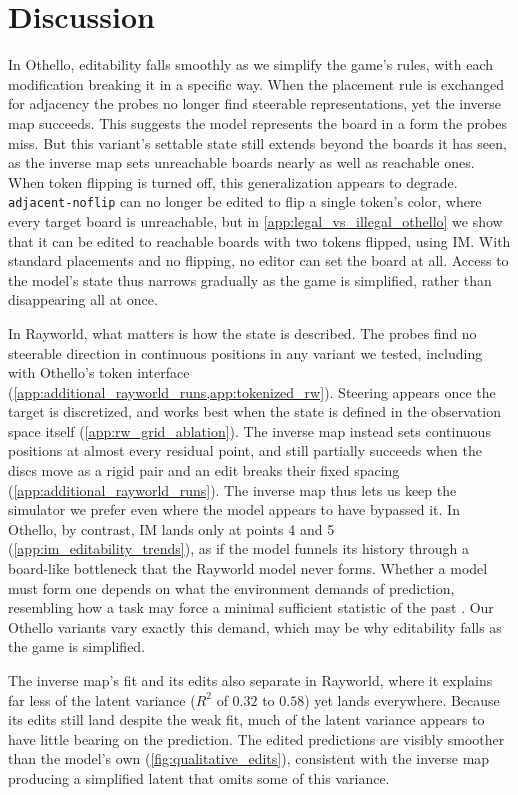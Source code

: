 \documentclass{article} %
\begin{document}
\section{Discussion}
In Othello, editability falls smoothly as we simplify the game's rules, with each modification breaking it in a specific way. When the placement rule is exchanged for adjacency the probes no longer find steerable representations, yet the inverse map succeeds. This suggests the model represents the board in a form the probes miss. But this variant's settable state still extends beyond the boards it has seen, as the inverse map sets unreachable boards nearly as well as reachable ones. When token flipping is turned off, this generalization appears to degrade. \texttt{adjacent-noflip} can no longer be edited to flip a single token's color, where every target board is unreachable, but in \cref{app:legal_vs_illegal_othello} we show that it can be edited to reachable boards with two tokens flipped, using IM. With standard placements and no flipping, no editor can set the board at all. Access to the model's state thus narrows gradually as the game is simplified, rather than disappearing all at once.

In Rayworld, what matters is how the state is described. The probes find no steerable direction in continuous positions in any variant we tested, including with Othello's token interface (\cref{app:additional_rayworld_runs,app:tokenized_rw}). Steering appears once the target is discretized, and works best when the state is defined in the observation space itself (\cref{app:rw_grid_ablation}). The inverse map instead sets continuous positions at almost every residual point, and still partially succeeds when the discs move as a rigid pair and an edit breaks their fixed spacing (\cref{app:additional_rayworld_runs}). The inverse map thus lets us keep the simulator we prefer even where the model appears to have bypassed it. In Othello, by contrast, IM lands only at points 4 and 5 (\cref{app:im_editability_trends}), as if the model funnels its history through a board-like bottleneck that the Rayworld model never forms. Whether a model must form one depends on what the environment demands of prediction, resembling how a task may force a minimal sufficient statistic of the past \citep{shalizi2001computational}. Our Othello variants vary exactly this demand, which may be why editability falls as the game is simplified.

The inverse map's fit and its edits also separate in Rayworld, where it explains far less of the latent variance ($R^2$ of $0.32$ to $0.58$) yet lands everywhere. Because its edits still land despite the weak fit, much of the latent variance appears to have little bearing on the prediction. The edited predictions are visibly smoother than the model's own (\cref{fig:qualitative_edits}), consistent with the inverse map producing a simplified latent that omits some of this variance.
\end{document}

